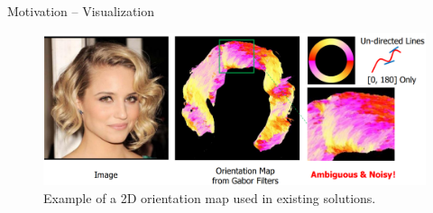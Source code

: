 \begin{frame}[t]{Motivation -- Visualization}
    \begin{figure}[t]
        \centering
        \includegraphics[width=0.9\linewidth]{assets/figures/motivations/orientation-map.png}
        \caption{Example of a 2D orientation map used in existing solutions.}
        \label{fig:motivation-orientation-map}
    \end{figure}
\end{frame}
